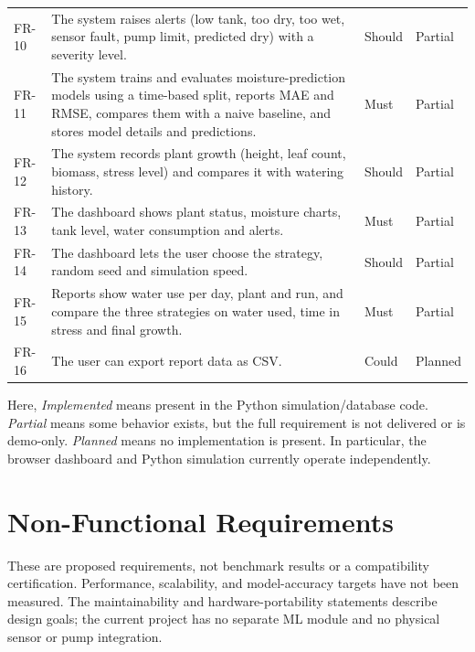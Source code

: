 \documentclass[11pt,a4paper]{article}
\begin{document}
\begin{xltabular}{\textwidth}{@{}l Y l l@{}}
  FR-10 & The system raises alerts (low tank, too dry, too wet, sensor fault, pump limit, predicted dry) with a severity level. & Should & Partial\\
  FR-11 & The system trains and evaluates moisture-prediction models using a time-based split, reports MAE and RMSE, compares them with a naive baseline, and stores model details and predictions. & Must & Partial\\
  FR-12 & The system records plant growth (height, leaf count, biomass, stress level) and compares it with watering history. & Should & Partial\\
  FR-13 & The dashboard shows plant status, moisture charts, tank level, water consumption and alerts. & Must & Partial\\
  FR-14 & The dashboard lets the user choose the strategy, random seed and simulation speed. & Should & Partial\\
  FR-15 & Reports show water use per day, plant and run, and compare the three strategies on water used, time in stress and final growth. & Must & Partial\\
  FR-16 & The user can export report data as CSV. & Could & Planned\\
  \bottomrule
\end{xltabular}
Here, \emph{Implemented} means present in the Python simulation/database code.
\emph{Partial} means some behavior exists, but the full requirement is not
delivered or is demo-only. \emph{Planned} means no implementation is present.
In particular, the browser dashboard and Python simulation currently operate
independently.

\section{Non-Functional Requirements}
These are proposed requirements, not benchmark results or a compatibility
certification. Performance, scalability, and model-accuracy targets have not
been measured. The maintainability and hardware-portability statements
describe design goals; the current project has no separate ML module and no
physical sensor or pump integration.
\end{document}
